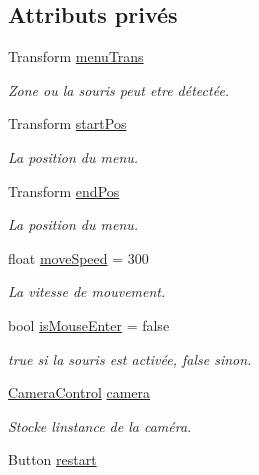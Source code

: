 \subsection*{Attributs privés}
\begin{DoxyCompactItemize}
\item 
Transform \mbox{\hyperlink{class_menu_visualization_u_i_a491555371450cb31cfb730f16ab5a0bd}{menu\+Trans}}
\begin{DoxyCompactList}\small\item\em Zone ou la souris peut etre détectée. \end{DoxyCompactList}\item 
Transform \mbox{\hyperlink{class_menu_visualization_u_i_afd585b84497729b656706b4f163defe1}{start\+Pos}}
\begin{DoxyCompactList}\small\item\em La position du menu. \end{DoxyCompactList}\item 
Transform \mbox{\hyperlink{class_menu_visualization_u_i_aca26bc81a47e95274e282b0688d48ab0}{end\+Pos}}
\begin{DoxyCompactList}\small\item\em La position du menu. \end{DoxyCompactList}\item 
float \mbox{\hyperlink{class_menu_visualization_u_i_a13e28cb9219cab1e48b80d75be689603}{move\+Speed}} = 300
\begin{DoxyCompactList}\small\item\em La vitesse de mouvement. \end{DoxyCompactList}\item 
bool \mbox{\hyperlink{class_menu_visualization_u_i_abd99e9bed58deeed6f8cd1c329dbe100}{is\+Mouse\+Enter}} = false
\begin{DoxyCompactList}\small\item\em true si la souris est activée, false sinon. \end{DoxyCompactList}\item 
\mbox{\hyperlink{class_camera_control}{Camera\+Control}} \mbox{\hyperlink{class_menu_visualization_u_i_acbeec950a81f60bf3cd493d9e4a99896}{camera}}
\begin{DoxyCompactList}\small\item\em Stocke l\textquotesingle{}instance de la caméra. \end{DoxyCompactList}\item 
Button \mbox{\hyperlink{class_menu_visualization_u_i_ab14033508bbd734ad84b841cccbbdbaa}{restart}}

\end{DoxyCompactItemize}
